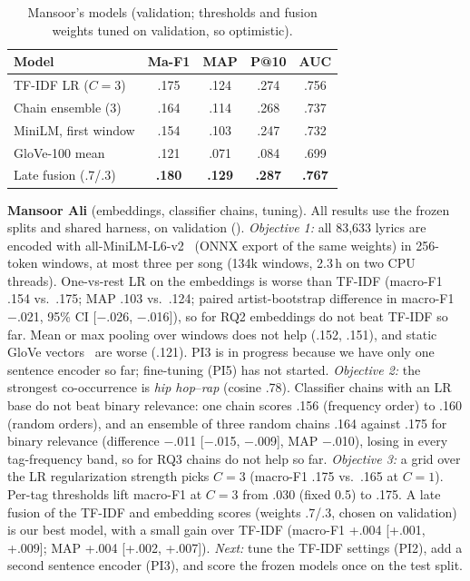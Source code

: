 \documentclass{article}
\begin{document}
\begin{table}[t]
\centering\small
\setlength{\tabcolsep}{3.5pt}
\begin{tabular}{@{}lcccc@{}}
\toprule
Model & Ma-F1 & MAP & P@10 & AUC \\
\midrule
TF-IDF LR ($C{=}3$) & .175 & .124 & .274 & .756 \\
Chain ensemble (3) & .164 & .114 & .268 & .737 \\
MiniLM, first window & .154 & .103 & .247 & .732 \\
GloVe-100 mean & .121 & .071 & .084 & .699 \\
Late fusion (.7/.3) & \textbf{.180} & \textbf{.129} & \textbf{.287} & \textbf{.767} \\
\bottomrule
\end{tabular}
\caption{Mansoor's models (validation; thresholds and fusion weights tuned on validation, so optimistic).}
\label{tab:mansoor}
\end{table}

\textbf{Mansoor Ali} (embeddings, classifier chains, tuning). All results use the frozen splits and shared harness, on validation (). \emph{Objective 1:} all 83,633 lyrics are encoded with all-MiniLM-L6-v2~\cite{reimers2019sbert} (ONNX export of the same weights) in 256-token windows, at most three per song (134k windows, 2.3\,h on two CPU threads). One-vs-rest LR on the embeddings is worse than TF-IDF (macro-F1 .154 vs.\ .175; MAP .103 vs.\ .124; paired artist-bootstrap difference in macro-F1 $-$.021, 95\% CI [$-$.026, $-$.016]), so for RQ2 embeddings do not beat TF-IDF so far. Mean or max pooling over windows does not help (.152, .151), and static GloVe vectors~\cite{pennington2014glove} are worse (.121). PI3 is in progress because we have only one sentence encoder so far; fine-tuning (PI5) has not started. \emph{Objective 2:} the strongest co-occurrence is \emph{hip hop}--\emph{rap} (cosine .78). Classifier chains with an LR base do not beat binary relevance: one chain scores .156 (frequency order) to .160 (random orders), and an ensemble of three random chains .164 against .175 for binary relevance (difference $-$.011 [$-$.015, $-$.009], MAP $-$.010), losing in every tag-frequency band, so for RQ3 chains do not help so far. \emph{Objective 3:} a grid over the LR regularization strength picks $C{=}3$ (macro-F1 .175 vs.\ .165 at $C{=}1$). Per-tag thresholds lift macro-F1 at $C{=}3$ from .030 (fixed 0.5) to .175. A late fusion of the TF-IDF and embedding scores (weights .7/.3, chosen on validation) is our best model, with a small gain over TF-IDF (macro-F1 +.004 [+.001, +.009]; MAP +.004 [+.002, +.007]). \emph{Next:} tune the TF-IDF settings (PI2), add a second sentence encoder (PI3), and score the frozen models once on the test split.
\end{document}
